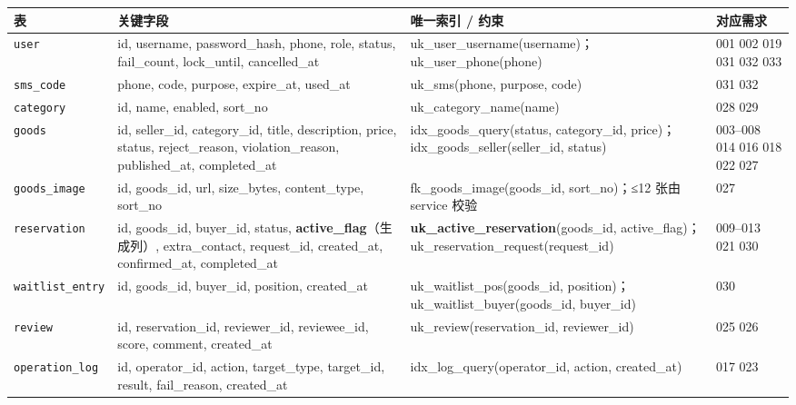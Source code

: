 \documentclass[UTF8,a4paper,12pt]{ctexart}
\begin{document}
{\footnotesize
\begin{longtable}{p{2.9cm}p{4.8cm}p{5.0cm}p{2.1cm}}
\toprule
表 & 关键字段 & 唯一索引 / 约束 & 对应需求 \\
\midrule
\endhead
\texttt{user} & id, username, password\_hash, phone, role, status, fail\_count, lock\_until, cancelled\_at & uk\_user\_username(username)；uk\_user\_phone(phone) & 001 002 019 031 032 033 \\
\texttt{sms\_code} & phone, code, purpose, expire\_at, used\_at & uk\_sms(phone, purpose, code) & 031 032 \\
\texttt{category} & id, name, enabled, sort\_no & uk\_category\_name(name) & 028 029 \\
\texttt{goods} & id, seller\_id, category\_id, title, description, price, status, reject\_reason, violation\_reason, published\_at, completed\_at & idx\_goods\_query(status, category\_id, price)；idx\_goods\_seller(seller\_id, status) & 003--008 014 016 018 022 027 \\
\texttt{goods\_image} & id, goods\_id, url, size\_bytes, content\_type, sort\_no & fk\_goods\_image(goods\_id, sort\_no)；≤12 张由 service 校验 & 027 \\
\texttt{reservation} & id, goods\_id, buyer\_id, status, \textbf{active\_flag}\newline（生成列）, extra\_contact, request\_id, created\_at, confirmed\_at, completed\_at & \textbf{uk\_active\_reservation}\newline (goods\_id, active\_flag)；\newline uk\_reservation\_request\newline (request\_id) & 009--013\newline 020 021\newline 024 030\newline 035 \\
\texttt{waitlist}\allowbreak\texttt{\_entry} & id, goods\_id, buyer\_id, position, created\_at & uk\_waitlist\_pos(goods\_id, position)；uk\_waitlist\_buyer(goods\_id, buyer\_id) & 030 \\
\texttt{review} & id, reservation\_id, reviewer\_id, reviewee\_id, score, comment, created\_at & uk\_review(reservation\_id, reviewer\_id) & 025 026 \\
\texttt{operation\_log} & id, operator\_id, action, target\_type, target\_id, result, fail\_reason, created\_at & idx\_log\_query(operator\_id, action, created\_at) & 017 023 \\
\bottomrule
\end{longtable}
}
\end{document}

